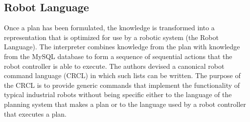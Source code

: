 \subsection{Robot Language}
Once a plan has been formulated, the knowledge is transformed into a
representation that is optimized for use by a robotic system (the Robot
Language). The interpreter combines knowledge from the plan with knowledge
from the MySQL database to form a sequence of sequential actions that the
robot controller is able to execute. The authors devised a canonical robot
command language (CRCL) in which such lists can be written. The purpose of
the CRCL is to provide generic commands that implement the functionality of
typical industrial robots without being specific either to the language of
the planning system that makes a plan or to the language used by a robot
controller that executes a plan.